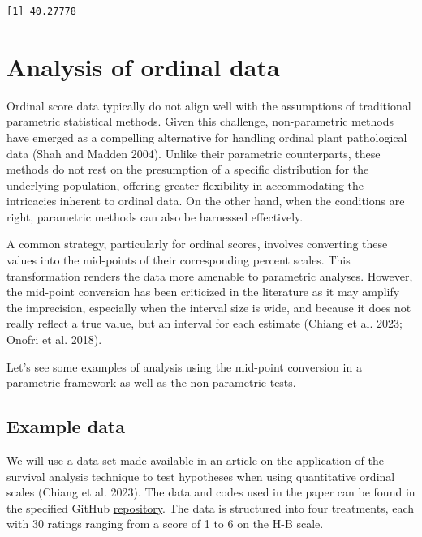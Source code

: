 \documentclass[
  letterpaper,
]{book}
\begin{document}
\begin{verbatim}
[1] 40.27778
\end{verbatim}

\hypertarget{analysis-of-ordinal-data}{%
\section{Analysis of ordinal data}\label{analysis-of-ordinal-data}}

Ordinal score data typically do not align well with the assumptions of
traditional parametric statistical methods. Given this challenge,
non-parametric methods have emerged as a compelling alternative for
handling ordinal plant pathological data (Shah and Madden 2004). Unlike
their parametric counterparts, these methods do not rest on the
presumption of a specific distribution for the underlying population,
offering greater flexibility in accommodating the intricacies inherent
to ordinal data. On the other hand, when the conditions are right,
parametric methods can also be harnessed effectively.

A common strategy, particularly for ordinal scores, involves converting
these values into the mid-points of their corresponding percent scales.
This transformation renders the data more amenable to parametric
analyses. However, the mid-point conversion has been criticized in the
literature as it may amplify the imprecision, especially when the
interval size is wide, and because it does not really reflect a true
value, but an interval for each estimate (Chiang et al. 2023; Onofri et
al. 2018).

Let's see some examples of analysis using the mid-point conversion in a
parametric framework as well as the non-parametric tests.

\hypertarget{example-data}{%
\subsection{Example data}\label{example-data}}

We will use a data set made available in an article on the application
of the survival analysis technique to test hypotheses when using
quantitative ordinal scales (Chiang et al. 2023). The data and codes
used in the paper can be found in the specified GitHub
\href{https://github.com/StatisticalMethodsinPlantProtection/CompMuCens}{repository}.
The data is structured into four treatments, each with 30 ratings
ranging from a score of 1 to 6 on the H-B scale.
\end{document}
